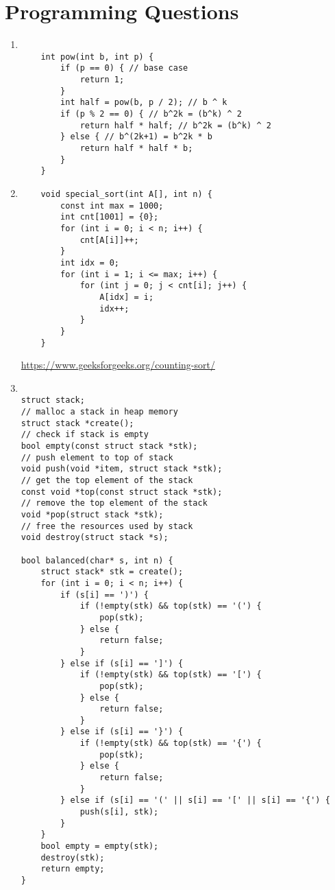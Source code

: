 \documentclass{article}
\begin{document}
\begin{enumerate}
\end{enumerate}

\newpage
\section*{Programming Questions}

\begin{enumerate}
    \item 

    \begin{lstlisting}
        
    int pow(int b, int p) {
        if (p == 0) { // base case
            return 1;
        }
        int half = pow(b, p / 2); // b ^ k
        if (p % 2 == 0) { // b^2k = (b^k) ^ 2
            return half * half; // b^2k = (b^k) ^ 2
        } else { // b^(2k+1) = b^2k * b
            return half * half * b;
        }
    }
    \end{lstlisting}
    \newpage
    \item
    \begin{lstlisting}
    void special_sort(int A[], int n) {
        const int max = 1000;
        int cnt[1001] = {0};
        for (int i = 0; i < n; i++) {
            cnt[A[i]]++;
        }
        int idx = 0;
        for (int i = 1; i <= max; i++) {
            for (int j = 0; j < cnt[i]; j++) {
                A[idx] = i;
                idx++;
            }
        }
    }
    \end{lstlisting}
    \url{https://www.geeksforgeeks.org/counting-sort/}

    \newpage
    \item

    \begin{lstlisting}
        
struct stack;
// malloc a stack in heap memory
struct stack *create();
// check if stack is empty
bool empty(const struct stack *stk);
// push element to top of stack
void push(void *item, struct stack *stk);
// get the top element of the stack
const void *top(const struct stack *stk);
// remove the top element of the stack
void *pop(struct stack *stk);
// free the resources used by stack
void destroy(struct stack *s);

bool balanced(char* s, int n) {
    struct stack* stk = create();
    for (int i = 0; i < n; i++) {
        if (s[i] == ')') {
            if (!empty(stk) && top(stk) == '(') {
                pop(stk);
            } else {
                return false;
            }
        } else if (s[i] == ']') {
            if (!empty(stk) && top(stk) == '[') {
                pop(stk);
            } else {
                return false;
            }
        } else if (s[i] == '}') {
            if (!empty(stk) && top(stk) == '{') {
                pop(stk);
            } else {
                return false;
            }
        } else if (s[i] == '(' || s[i] == '[' || s[i] == '{') {
            push(s[i], stk);
        }
    }
    bool empty = empty(stk);
    destroy(stk);
    return empty;
}



\end{lstlisting}
\end{enumerate}
\end{document}
